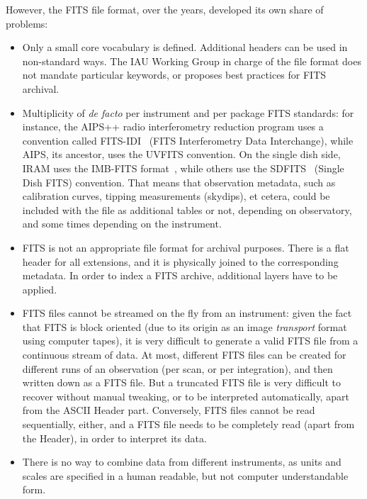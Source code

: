 			 However, the FITS file format, over the years,
			developed its own share of problems:

			\begin{itemize}
				\item Only a small core vocabulary is defined.
				Additional headers can be used in non-standard
				ways. The IAU Working Group in charge of the file
				format does not mandate particular keywords, or
				proposes best practices for FITS archival.
				
				 \item Multiplicity of \emph{de facto} per
				instrument and per package FITS standards: for
				instance, the AIPS++ radio interferometry reduction
				program uses a convention called
				FITS-IDI~\cite{2000aips.memo..102F} (FITS
				Interferometry Data Interchange), while AIPS, its
				ancestor, uses the UVFITS convention. On the single
				dish side, IRAM uses the IMB-FITS
				format~\cite{MudPolHat0512Multi-Beam}, while others
				use the SDFITS~\cite{2000ASPC..216..243G} (Single
				Dish FITS) convention. That means that observation
				metadata, such as calibration curves, tipping
				measurements (skydips), et cetera, could be
				included with the file as additional tables or not,
				depending on observatory, and some times depending
				on the instrument.
				
				 \item FITS is not an appropriate file format for
				archival purposes. There is a flat header for all
				extensions, and it is physically joined to the
				corresponding metadata. In order to index a FITS
				archive, additional layers have to be applied.
				
				 \item FITS files cannot be streamed on the fly
				from an instrument: given the fact that FITS is
				block oriented (due to its origin as an image
				\emph{transport} format using computer tapes), it
				is very difficult to generate a valid FITS file
				from a continuous stream of data. At most,
				different FITS files can be created for different
				runs of an observation (per scan, or per
				integration), and then written down as a FITS file.
				But a truncated FITS file is very difficult to
				recover without manual tweaking, or to be
				interpreted automatically, apart from the ASCII
				Header part. Conversely, FITS files cannot be read
				sequentially, either, and a FITS file needs to be
				completely read (apart from the Header), in order
				to interpret its data.
				
				 \item There is no way to combine data from
				different instruments, as units and scales are
				specified in a human readable, but not computer
				understandable form.
			\end{itemize}

